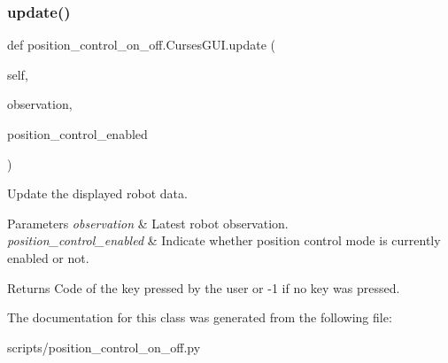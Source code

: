 \subsubsection{\texorpdfstring{update()}{update()}}
{\footnotesize\ttfamily def position\+\_\+control\+\_\+on\+\_\+off.\+Curses\+G\+U\+I.\+update (\begin{DoxyParamCaption}\item[{}]{self,  }\item[{}]{observation,  }\item[{}]{position\+\_\+control\+\_\+enabled }\end{DoxyParamCaption})}



Update the displayed robot data. 


\begin{DoxyParams}{Parameters}
{\em observation} & Latest robot observation. \\
\hline
{\em position\+\_\+control\+\_\+enabled} & Indicate whether position control mode is currently enabled or not.\\
\hline
\end{DoxyParams}
\begin{DoxyReturn}{Returns}
Code of the key pressed by the user or -\/1 if no key was pressed. 
\end{DoxyReturn}


The documentation for this class was generated from the following file\+:\begin{DoxyCompactItemize}
\item 
scripts/position\+\_\+control\+\_\+on\+\_\+off.\+py\end{DoxyCompactItemize}
